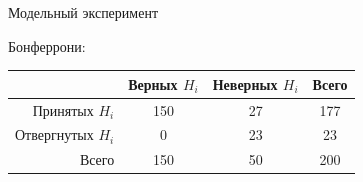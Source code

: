 \documentclass[9pt,pdf,utf8,hyperref={unicode},aspectratio=169]{beamer}
\begin{document}
\begin{frame}{Модельный эксперимент}
    \bigskip

    Бонферрони:
    \begin{center}
        \begin{tabular}{ |r | c | c | c |}
        \hline
                          & Верных $H_i$ & Неверных $H_i$ & Всего \\ \hline
        Принятых $H_i$    & 150          & 27             & 177   \\ \hline
        Отвергнутых $H_i$ & 0            & 23             & 23    \\ \hline
        Всего             & 150          & 50             & 200   \\ \hline
        \end{tabular}
    \end{center}
\end{frame}
\end{document}
